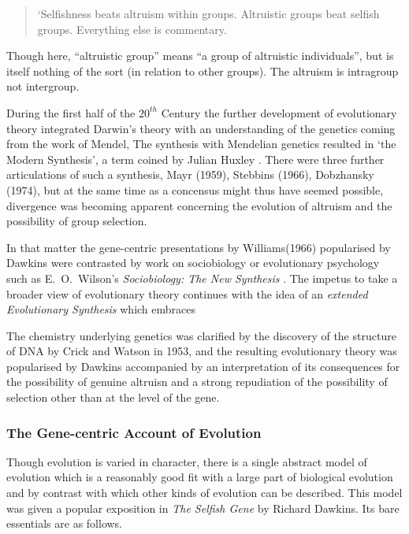 \documentclass[10pt,titlepage]{book}
\begin{document}
\begin{quote}
`Selfishness beats altruism within groups.
Altruistic groups beat selfish groups.
Everything else is commentary.
\end{quote}
\cite{wilson2007rethinking,wilson2015does}

Though here, ``altruistic group'' means ``a group of altruistic individuals'', but is itself nothing of the sort (in relation to other groups).
The altruism is intragroup not intergroup.

During the first half of the $20^{th}$ Century the further development of evolutionary theory integrated Darwin's theory with an understanding of the genetics coming from the work of Mendel,
The synthesis with Mendelian genetics resulted in `the Modern Synthesis', a term coined by Julian Huxley \cite{huxley-tms}.
There were three further articulations of such a synthesis, Mayr (1959), Stebbins (1966), Dobzhansky (1974), but at the same time as a concensus might thus have seemed possible, divergence was becoming apparent concerning the evolution of altruism and the possibility of group selection.

In that matter the gene-centric presentations by Williams(1966) \cite{williams-ans} popularised by Dawkins \cite{dawkinsSG} were contrasted by work on sociobiology or evolutionary psychology such as E.~O.~Wilson's \emph{Sociobiology: The New Synthesis} \cite{wilson-stns}.
The impetus to take a broader view of evolutionary theory continues with the idea of an \emph{extended Evolutionary Synthesis} which embraces 

The chemistry underlying genetics was clarified by the discovery of the structure of DNA by Crick and Watson in 1953, and the resulting evolutionary theory was popularised by Dawkins accompanied by an interpretation of its consequences for the possibility of genuine altruisn \cite{dawkinsSG} and a strong repudiation of the possibility of selection other than at the level of the gene.

\subsubsection{The Gene-centric Account of Evolution}

Though evolution is varied in character, there is a single abstract model of evolution which is a reasonably good fit with a large part of biological evolution and by contrast with which other kinds of evolution can be described.
This model was given a popular exposition in \emph{The Selfish Gene}\cite{dawkinsSG} by Richard Dawkins.
Its bare essentials are as follows.
\end{document}
